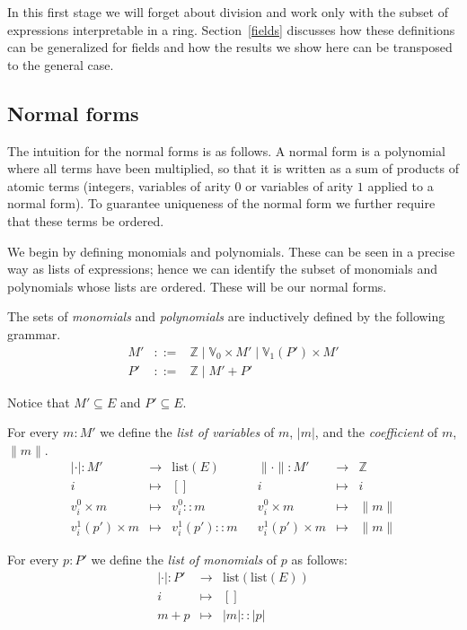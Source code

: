 \documentclass[numreferences]{kluwer}
\newcommand{\alt}{\mathrel{|}}
\newcommand{\Z}{{\mathbb Z}}
\newcommand{\V}{{\mathbb V}}
\begin{document}
\begin{article}
In this first stage we will forget about division and work only with
the subset of expressions interpretable in a ring.
Section~\ref{fields} discusses how these definitions can be
generalized for fields and how the results we show here can be
transposed to the general case.

\subsection{Normal forms}\label{nf}

The intuition for the normal forms is as follows.  A normal form is a
polynomial where all terms have been multiplied, so that it is written
as a sum of products of atomic terms (integers, variables of arity $0$ or
variables of arity $1$ applied to a normal form).  To guarantee uniqueness
of the normal form we further require that these terms be ordered.

We begin by defining monomials and polynomials.  These can be seen in
a precise way as lists of expressions; hence we can identify the
subset of monomials and polynomials whose lists are ordered.  These
will be our normal forms.

\begin{definition}\label{def:prenf}
The sets of \emph{monomials} and \emph{polynomials} are inductively
defined by the following grammar.
\begin{eqnarray*}
M' & ::= & \Z \alt \V_0\times M' \alt \V_1(P')\times M' \\
P' & ::= & \Z \alt M'+P'
\end{eqnarray*}
\end{definition}
Notice that $M'\subseteq E$ and $P'\subseteq E$.

\begin{definition}\label{def:monabs}
For every $m:M'$ we define the \emph{list of variables} of $m$, $|m|$, and
the \emph{coefficient} of $m$, $\|m\|$.
\[\begin{array}{rclcrcl}
|\cdot| : M' & \to & \mathrm{list}(E) & & \|\cdot\| : M' & \to & \Z \\
 i & \mapsto & [] & & i & \mapsto & i \\
 v^0_i\times m & \mapsto & v^0_i :: m & & v^0_i\times m & \mapsto & \|m\| \\
 v^1_i(p')\times m & \mapsto & v^1_i(p') :: m
  & & v^1_i(p')\times m & \mapsto & \|m\|
\end{array}\]
\end{definition}

\begin{definition}\label{def:polabs}
For every $p:P'$ we define the \emph{list of monomials} of $p$ as follows:
\begin{eqnarray*}
|\cdot| : P' & \to & \mathrm{list}(\mathrm{list}(E)) \\
 i & \mapsto & [] \\
 m+p & \mapsto & |m| :: |p|
\end{eqnarray*}
\end{definition}


\end{article}
\end{document}
